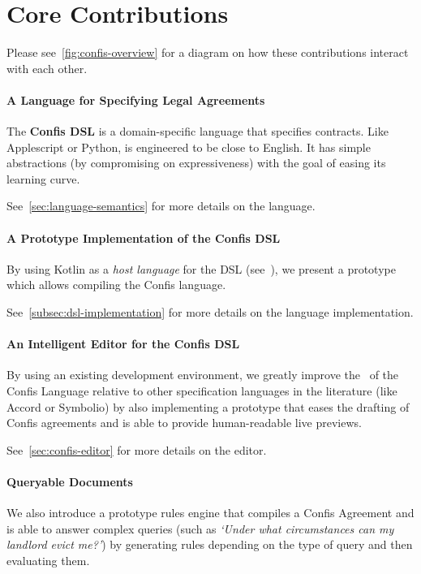 \section*{Core Contributions}

Please see~\autoref{fig:confis-overview} for a diagram on how these contributions interact with each other.

\paragraph{A Language for Specifying Legal Agreements}
The \textbf{Confis DSL} is a domain-specific language that specifies contracts.
Like Applescript or Python, is engineered to be close to English.
It has simple abstractions (by compromising on expressiveness) with the goal of easing its learning curve.

See~\autoref{sec:language-semantics} for more details on the language.

\paragraph{A Prototype Implementation of the Confis DSL}
By using Kotlin as a \emph{host language} for the DSL (see~), we present a prototype which allows compiling the Confis language.

See~\autoref{subsec:dsl-implementation} for more details on the language implementation.

\paragraph{An Intelligent Editor for the Confis DSL}
By using an existing development environment, we greatly improve the~ of the Confis Language relative to other specification languages in the literature (like Accord or Symbolio) by also implementing a prototype that eases the drafting of Confis agreements and is able to provide human-readable live previews.

See~\autoref{sec:confis-editor} for more details on the editor.

\paragraph{Queryable Documents} We also introduce a prototype rules engine that compiles a Confis Agreement and is able to answer complex queries (such as \emph{`Under what circumstances can my landlord evict me?'}) by generating rules depending on the type of query and then evaluating them.

